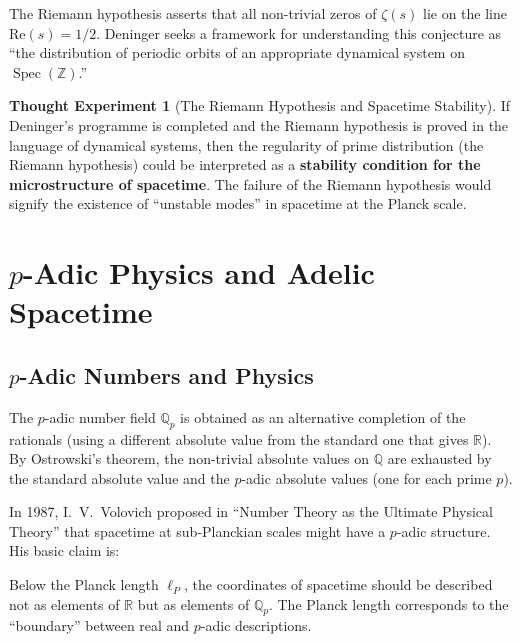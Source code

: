 \documentclass[12pt,a4paper]{article}
\theoremstyle{definition}
\newtheorem{thought}[definition]{Thought Experiment}
\newcommand{\Spec}{\operatorname{Spec}}
\begin{document}
The Riemann hypothesis asserts that all non-trivial zeros of $\zeta(s)$ lie on the line $\mathrm{Re}(s) = 1/2$. Deninger seeks a framework for understanding this conjecture as ``the distribution of periodic orbits of an appropriate dynamical system on $\Spec(\mathbb{Z})$.''

\begin{thought}[The Riemann Hypothesis and Spacetime Stability]
If Deninger's programme is completed and the Riemann hypothesis is proved in the language of dynamical systems, then the regularity of prime distribution (the Riemann hypothesis) could be interpreted as a \textbf{stability condition for the microstructure of spacetime}. The failure of the Riemann hypothesis would signify the existence of ``unstable modes'' in spacetime at the Planck scale.
\end{thought}


\newpage
\section{$p$-Adic Physics and Adelic Spacetime}
\label{sec:padic}

\subsection{$p$-Adic Numbers and Physics}

The $p$-adic number field $\mathbb{Q}_p$ is obtained as an alternative completion of the rationals (using a different absolute value from the standard one that gives $\mathbb{R}$). By Ostrowski's theorem, the non-trivial absolute values on $\mathbb{Q}$ are exhausted by the standard absolute value and the $p$-adic absolute values (one for each prime $p$).

In 1987, I.~V.~Volovich proposed in ``Number Theory as the Ultimate Physical Theory'' \cite{Volovich1987} that spacetime at sub-Planckian scales might have a $p$-adic structure. His basic claim is:

\begin{keyinsight}
Below the Planck length $\ell_P$, the coordinates of spacetime should be described not as elements of $\mathbb{R}$ but as elements of $\mathbb{Q}_p$. The Planck length corresponds to the ``boundary'' between real and $p$-adic descriptions.
\end{keyinsight}
\end{document}
